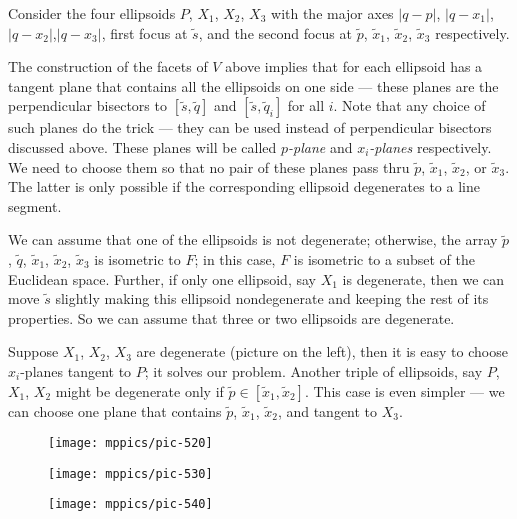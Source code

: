 \documentclass{article}
\begin{document}
Consider the four ellipsoids $P$, $X_1$, $X_2$, $X_3$ with the major axes $|q-p|$, $|q-x_1|$, $|q-x_2|$,$|q-x_3|$, first focus at $\tilde s$, and the second focus at $\tilde p$, $\tilde x_1$, $\tilde x_2$, $\tilde x_3$ respectively.

The construction of the facets of $V$ above implies that for each ellipsoid has a tangent plane that contains all the ellipsoids on one side --- these planes are the perpendicular bisectors to $[\tilde s,\tilde q]$ and $[\tilde s,\tilde q_i]$ for all $i$.
Note that any choice of such planes do the trick --- they can be used instead of perpendicular bisectors discussed above.
These planes will be called \emph{$p$-plane} and \emph{$x_i$-planes} respectively.
We need to choose them so that no pair of these planes pass thru $\tilde p$, $\tilde x_1$, $\tilde x_2$, or $\tilde x_3$.
The latter is only possible if the corresponding ellipsoid degenerates to a line segment.

We can assume that one of the ellipsoids is not degenerate; otherwise, the array $\tilde p$, $\tilde q$, $\tilde x_1$, $\tilde x_2$, $\tilde x_3$ is isometric to $F$;
in this case, $F$ is isometric to a subset of the Euclidean space.
Further, if only one ellipsoid, say $X_1$ is degenerate, then we can move $\tilde s$ slightly making this ellipsoid nondegenerate and keeping the rest of its properties.
So we can assume that three or two ellipsoids are degenerate.

Suppose $X_1$, $X_2$, $X_3$ are degenerate (picture on the left), then it is easy to choose $x_i$-planes tangent to $P$; it solves our problem.
Another triple of ellipsoids, say $P$, $X_1$, $X_2$ might be degenerate only if $\tilde p\in[\tilde x_1,\tilde x_2]$.
This case is even simpler --- we can choose one plane that contains $\tilde p$, $\tilde x_1$, $\tilde x_2$, and tangent to $X_3$.

\begin{figure}[!ht]
\begin{minipage}{.3\textwidth}
\centering
\texttt{[image: mppics/pic-520]}
\end{minipage}
\hfill
\begin{minipage}{.3\textwidth}
\centering
\texttt{[image: mppics/pic-530]}
\end{minipage}
\hfill
\begin{minipage}{.3\textwidth}
\centering
\texttt{[image: mppics/pic-540]}
\end{minipage}
\end{figure}
\end{document}
